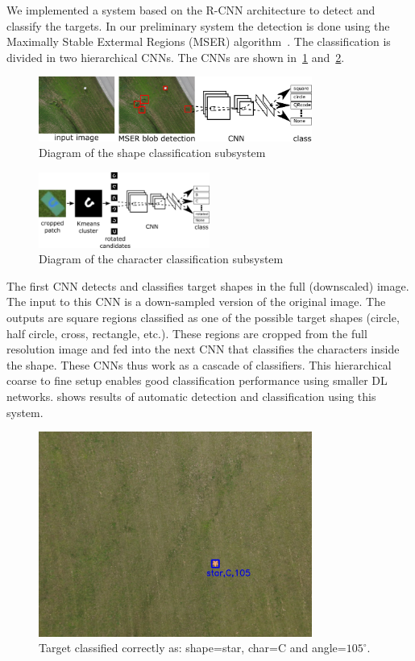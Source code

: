 \documentclass[a4paper]{article} %
\begin{document}
We implemented a system based on the R-CNN architecture to detect and classify
the targets. In our preliminary system the detection is done using the Maximally
Stable Extermal Regions (MSER) algorithm~\cite{Forssen2007}. The classification
is divided in two hierarchical CNNs. The CNNs are shown
in~\cref{fig:shape_diagram} and~\cref{fig:letter_diagram}.
\begin{figure}[h]
	\centering
	\includegraphics[width=0.8\textwidth]{diagram}
	\caption{Diagram of the shape classification subsystem}
	\label{fig:shape_diagram}
\end{figure}
\begin{figure}[h]
	\centering
	\includegraphics[width=0.5\textwidth]{letter_diagram}
	\caption{Diagram of the character classification subsystem}
	\label{fig:letter_diagram}
\end{figure}
The first CNN detects and classifies target shapes in the full (downscaled)
image. The input to this CNN is a down-sampled version of the original
image. The outputs are square regions classified as one of the possible target
shapes (circle, half circle, cross, rectangle, etc.). These regions are cropped
from the full resolution image and fed into the next CNN that classifies
the characters inside the shape. These CNNs thus work as a cascade of
classifiers. This hierarchical coarse to fine setup enables good classification
performance using smaller DL networks.  shows
results of automatic detection and classification using this system.
\begin{figure}[h]
	\centering
	\includegraphics[width=0.8\textwidth]{true_positive_correct_letter2}
	\caption{Target classified correctly as: shape=star, char=C and angle=$105^\circ$.}
	\label{fig:true_positive2}
\end{figure}
\end{document}
